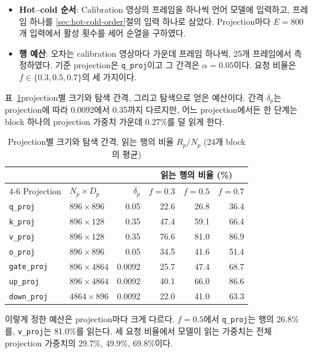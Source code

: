 \begin{itemize}
\item \textbf{Hot--cold 순서}: Calibration 영상의 프레임을 하나씩 언어 모델에 입력하고, 프레임 하나를 \ref{sec:hot-cold-order}절의 입력 하나로 삼았다. Projection마다 $E=800$개 입력에서 활성 횟수를 세어 순열을 구하였다.
\item \textbf{행 예산}: 오차는 calibration 영상마다 가운데 프레임 하나씩, 25개 프레임에서 측정하였다. 기준 projection은 \texttt{q\_proj}이고 그 간격은 $\alpha=0.05$이다. 요청 비율은 $f\in\{0.3,0.5,0.7\}$의 세 가지이다.
\end{itemize}

표~\ref{tab:projections}\는 projection별 크기와 탐색 간격, 그리고 탐색으로 얻은 예산이다. 간격 $\delta_p$는 projection에 따라 0.0092에서 0.35까지 다르지만, 어느 projection에서든 한 단계는 block 하나의 projection 가중치 가운데 0.27\%를 덜 읽게 한다.

\begin{table}[htbp]
    \centering
    \caption{Projection별 크기와 탐색 간격, 읽는 행의 비율 $R_p/N_p$ (24개 block의 평균)}
    \label{tab:projections}
    \begin{tabular}{llrrrr}
        \toprule
        & & & \multicolumn{3}{c}{읽는 행의 비율 (\%)} \\
        \cmidrule(lr){4-6}
        Projection & $N_p\times D_p$ & $\delta_p$ & $f=0.3$ & $f=0.5$ & $f=0.7$ \\
        \midrule
        \texttt{q\_proj} & $896\times896$ & 0.05 & 22.6 & 26.8 & 36.4 \\
        \texttt{k\_proj} & $896\times128$ & 0.35 & 47.4 & 59.1 & 66.4 \\
        \texttt{v\_proj} & $896\times128$ & 0.35 & 76.6 & 81.0 & 86.9 \\
        \texttt{o\_proj} & $896\times896$ & 0.05 & 34.5 & 41.6 & 51.4 \\
        \texttt{gate\_proj} & $896\times4864$ & 0.0092 & 25.7 & 47.4 & 68.7 \\
        \texttt{up\_proj} & $896\times4864$ & 0.0092 & 40.1 & 66.0 & 86.6 \\
        \texttt{down\_proj} & $4864\times896$ & 0.0092 & 22.0 & 41.0 & 63.3 \\
        \bottomrule
    \end{tabular}
\end{table}

이렇게 정한 예산은 projection마다 크게 다르다. $f=0.5$에서 \texttt{q\_proj}는 행의 26.8\%를, \texttt{v\_proj}는 81.0\%를 읽는다. 세 요청 비율에서 모델이 읽는 가중치는 전체 projection 가중치의 29.7\%, 49.9\%, 69.8\%이다.

